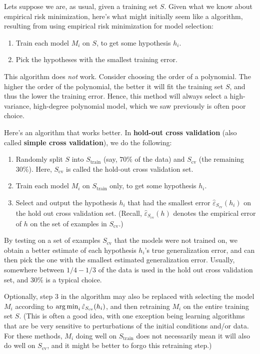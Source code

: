 \vspace{1cm}
\begin{fullwidth}
\label{sec:cross_validation}
\end{fullwidth}
Lets suppose we are, as usual, given a training set $S$. Given what we know
about empirical risk minimization, here's what might initially seem like a
algorithm, resulting from using empirical risk minimization for model selection:
\begin{enumerate}
    \item Train each model $M_i$ on $S$, to get some hypothesis $h_i$.
    \item Pick the hypotheses with the smallest training error.
\end{enumerate}

This algorithm does \textit{not} work. Consider choosing the order of a polynomial.
The higher the order of the polynomial, the better it will fit the
training set $S$, and thus the lower the training error. Hence, this method will
always select a high-variance, high-degree polynomial model, which we saw
previously is often poor choice.

Here's an algorithm that works better. In \textbf{hold-out cross validation}
(also called \textbf{simple cross validation}), we do the following:
\begin{enumerate}
    \item Randomly split $S$ into $S_\text{train}$ (say, $70\%$ of the data) and $S_\text{cv}$ (the remaining $30\%$). Here, $S_\text{cv}$ is called the hold-out cross validation set.
    \item Train each model $M_i$ on $S_\text{train}$ only, to get some hypothesis $h_i$.
    \item Select and output the hypothesis $h_i$ that had the smallest error $\hat{\varepsilon}_{S_\text{cv}}(h_i)$ on the hold out cross validation set. (Recall,  $\hat{\varepsilon}_{S_\text{cv}}(h)$ denotes the empirical error of $h$ on the set of examples in $S_\text{cv}$.)
\end{enumerate}

By testing on a set of examples $S_\text{cv}$ that the models were not trained on,
we obtain a better estimate of each hypothesis $h_i$'s true generalization error,
and can then pick the one with the smallest estimated generalization error.
Usually, somewhere between $1/4 - 1/3$ of the data is used in the hold out
cross validation set, and $30\%$ is a typical choice.

Optionally, step 3 in the algorithm may also be replaced with selecting
the model $M_i$ according to $\argmin_i \hat{\varepsilon}_{S_\text{cv}}(h_i)$, and then retraining $M_i$ on the
entire training set $S$. (This is often a good idea, with one exception being
learning algorithms that are be very sensitive to perturbations of the initial
conditions and/or data. For these methods, $M_i$ doing well on $S_\text{train}$ does not
necessarily mean it will also do well on $S_\text{cv}$, and it might be better to forgo
this retraining step.)


